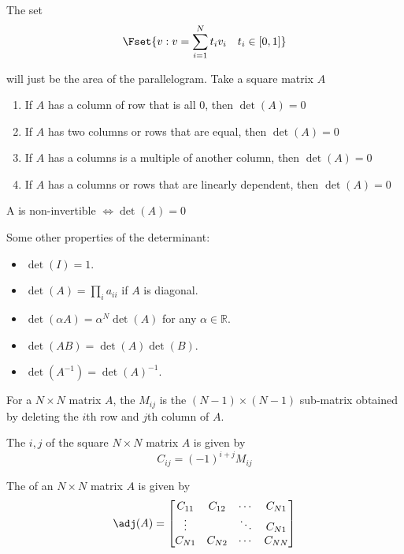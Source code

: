 \documentclass{article}
\begin{document}
The set
\[
  \Fset{v: v = \sum^{N}_{i = 1} t_i v_i \quad t_i \in [0, 1]}
\]

will just be the area of the parallelogram. Take a square matrix $A$
\begin{enumerate}
  \item If $A$ has a column of row that is all $0$, then $\det(A) = 0$
  \item If $A$ has two columns or rows that are equal, then $\det(A) = 0$
  \item If $A$ has a columns is a multiple of another column, then $\det(A) = 0$
  \item If $A$ has a columns or rows that are linearly dependent, then $\det(A) = 0$
\end{enumerate}

\begin{theorem}
  A is non-invertible $\iff \det(A) = 0$
\end{theorem}

Some other properties of the determinant:
\begin{itemize}[label=$\bullet$]
  \item $\det(I) = 1$.
  \item $\det(A) = \prod_{i} a_{ii}$ if $A$ is diagonal.
  \item $\det(\alpha A) = \alpha^N \det(A)$ for any $\alpha \in \mathbb{R}$.
  \item $\det(AB) = \det(A) \det(B)$.
  \item $\det(A^{-1}) = \det(A)^{-1}$.
\end{itemize}

\begin{definition}
  For a $N \times N$ matrix $A$, the $M_{ij}$  is the $(N - 1) \times (N - 1)$ sub-matrix obtained by deleting the $i$th row and $j$th column of $A$.
\end{definition}

\begin{definition}
  The $i, j$  of the square $N \times N$ matrix $A$ is given by
  \[
    C_{ij} = (-1)^{i + j} M_{ij}
  \]
\end{definition}

\begin{definition}
  The  of an $N \times N$ matrix $A$ is given by
  \[
    \adj(A) = \left[\begin{matrix}
        C_{11} & C_{12} & \cdots & C_{N1} \\
        \vdots &        & \ddots & C_{N1} \\
        C_{N1} & C_{N2} & \cdots & C_{NN}
    \end{matrix}\right]
  \]
\end{definition}
\end{document}
